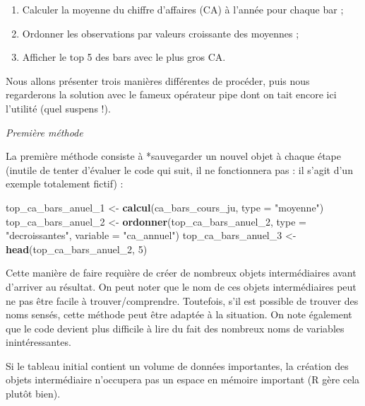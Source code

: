 \documentclass[
  11pt,
]{book}
\newenvironment{Shaded}{\begin{snugshade}}{\end{snugshade}}
\newcommand{\DataTypeTok}[1]{\textcolor[rgb]{0.13,0.29,0.53}{#1}}
\newcommand{\DecValTok}[1]{\textcolor[rgb]{0.00,0.00,0.81}{#1}}
\newcommand{\KeywordTok}[1]{\textcolor[rgb]{0.13,0.29,0.53}{\textbf{#1}}}
\newcommand{\NormalTok}[1]{#1}
\newcommand{\StringTok}[1]{\textcolor[rgb]{0.31,0.60,0.02}{#1}}
\providecommand{\tightlist}{%
  \setlength{\itemsep}{0pt}\setlength{\parskip}{0pt}}
\numberwithin{equation}{section}
\newcounter{countremarque}
\newenvironment{remarque}{%
 \refstepcounter{countremarque}
    \begin{tcolorbox}[width=\linewidth, colback=blue!3, boxrule=0.5pt,arc=0pt,title = Remarque \thecountremarque]
    }%
    {
    \end{tcolorbox}
    }
\numberwithin{countremarque}{section}
\begin{document}
\begin{enumerate}
\def\labelenumi{\arabic{enumi}.}
\tightlist
\item
  Calculer la moyenne du chiffre d'affaires (CA) à l'année pour chaque bar ;
\item
  Ordonner les observations par valeurs croissante des moyennes ;
\item
  Afficher le top 5 des bars avec le plus gros CA.
\end{enumerate}

Nous allons présenter trois manières différentes de procéder, puis nous regarderons la solution avec le fameux opérateur pipe dont on tait encore ici l'utilité (quel suspens !).

\emph{Première méthode}

La première méthode consiste à *sauvegarder un nouvel objet à chaque étape (inutile de tenter d'évaluer le code qui suit, il ne fonctionnera pas : il s'agit d'un exemple totalement fictif) :

\begin{Shaded}
\begin{Highlighting}[]
\NormalTok{top\_ca\_bars\_anuel\_}\DecValTok{1}\NormalTok{ \textless{}{-}}\StringTok{ }\KeywordTok{calcul}\NormalTok{(ca\_bars\_cours\_ju, }\DataTypeTok{type =} \StringTok{"moyenne"}\NormalTok{)}
\NormalTok{top\_ca\_bars\_anuel\_}\DecValTok{2}\NormalTok{ \textless{}{-}}\StringTok{ }\KeywordTok{ordonner}\NormalTok{(top\_ca\_bars\_anuel\_}\DecValTok{2}\NormalTok{,}
                            \DataTypeTok{type =} \StringTok{"decroissantes"}\NormalTok{, }\DataTypeTok{variable =} \StringTok{"ca\_annuel"}\NormalTok{)}
\NormalTok{top\_ca\_bars\_anuel\_}\DecValTok{3}\NormalTok{ \textless{}{-}}\StringTok{ }\KeywordTok{head}\NormalTok{(top\_ca\_bars\_anuel\_}\DecValTok{2}\NormalTok{, }\DecValTok{5}\NormalTok{)}
\end{Highlighting}
\end{Shaded}

Cette manière de faire requière de créer de nombreux objets intermédiaires avant d'arriver au résultat. On peut noter que le nom de ces objets intermédiaires peut ne pas être facile à trouver/comprendre. Toutefois, s'il est possible de trouver des noms sensés, cette méthode peut être adaptée à la situation. On note également que le code devient plus difficile à lire du fait des nombreux noms de variables inintéressantes.

\begin{remarque}
Si le tableau initial contient un volume de données importantes, la création des objets intermédiaire n'occupera pas un espace en mémoire important (R gère cela plutôt bien).
\end{remarque}
\end{document}
